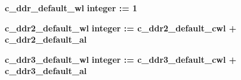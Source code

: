 \begin{DoxyCompactItemize}
\item 
{\bf c\+\_\+ddr\+\_\+default\+\_\+wl} {\bfseries \textcolor{comment}{integer}\textcolor{vhdlchar}{ }\textcolor{vhdlchar}{ }\textcolor{vhdlchar}{\+:}\textcolor{vhdlchar}{=}\textcolor{vhdlchar}{ }\textcolor{vhdlchar}{ } \textcolor{vhdldigit}{1} \textcolor{vhdlchar}{ }} 
\item 
{\bf c\+\_\+ddr2\+\_\+default\+\_\+wl} {\bfseries \textcolor{comment}{integer}\textcolor{vhdlchar}{ }\textcolor{vhdlchar}{ }\textcolor{vhdlchar}{\+:}\textcolor{vhdlchar}{=}\textcolor{vhdlchar}{ }\textcolor{vhdlchar}{ }\textcolor{vhdlchar}{ }\textcolor{vhdlchar}{ }{\bfseries {\bf c\+\_\+ddr2\+\_\+default\+\_\+cwl}} \textcolor{vhdlchar}{+}\textcolor{vhdlchar}{ }\textcolor{vhdlchar}{ }\textcolor{vhdlchar}{ }{\bfseries {\bf c\+\_\+ddr2\+\_\+default\+\_\+al}} \textcolor{vhdlchar}{ }} 
\item 
{\bf c\+\_\+ddr3\+\_\+default\+\_\+wl} {\bfseries \textcolor{comment}{integer}\textcolor{vhdlchar}{ }\textcolor{vhdlchar}{ }\textcolor{vhdlchar}{\+:}\textcolor{vhdlchar}{=}\textcolor{vhdlchar}{ }\textcolor{vhdlchar}{ }\textcolor{vhdlchar}{ }\textcolor{vhdlchar}{ }{\bfseries {\bf c\+\_\+ddr3\+\_\+default\+\_\+cwl}} \textcolor{vhdlchar}{+}\textcolor{vhdlchar}{ }\textcolor{vhdlchar}{ }\textcolor{vhdlchar}{ }{\bfseries {\bf c\+\_\+ddr3\+\_\+default\+\_\+al}} \textcolor{vhdlchar}{ }} 
\end{DoxyCompactItemize}
